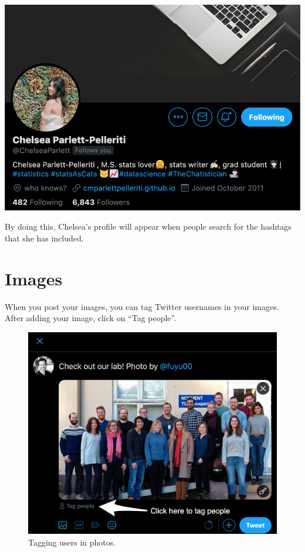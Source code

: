 \documentclass[
]{book}
\begin{document}
\begin{flushleft}\includegraphics[width=0.8\linewidth]{images/hashtagprofile} \end{flushleft}

By doing this, Chelsea's profile will appear when people search for the hashtags that she has included.

\hypertarget{images}{%
\section*{Images}\label{images}}

When you post your images, you can tag Twitter usernames in your images. After adding your image, click on ``Tag people''.

\begin{figure}

\includegraphics[width=0.8\linewidth]{images/tag} \hfill{}

\caption{Tagging users in photos.}\label{fig:unnamed-chunk-11}
\end{figure}
\end{document}
